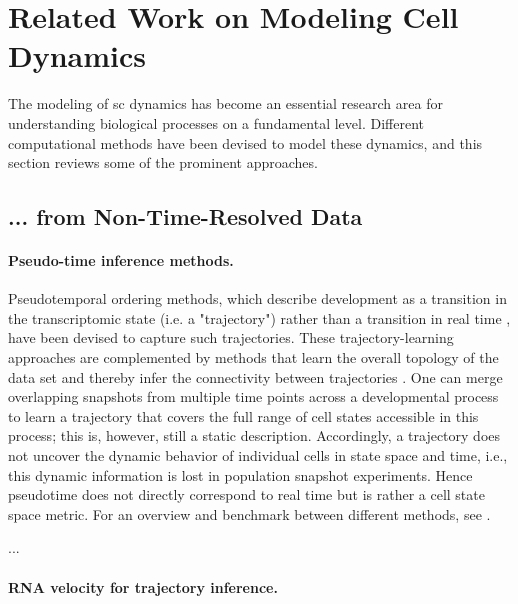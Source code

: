 \section{Related Work on Modeling Cell Dynamics}
\label{sec:related_work_bio}

The modeling of \acrlong{sc} dynamics has become an essential research area for understanding biological processes on a fundamental level. Different computational methods have been devised to model these dynamics, and this section reviews some of the prominent approaches.

\subsection*{... from Non-Time-Resolved Data}

\paragraph{Pseudo-time inference methods.}

Pseudotemporal ordering methods, which describe development as a transition in the transcriptomic state (i.e. a "trajectory") rather than a transition in real time \citep{haghverdi2016diffusion, trapnell2014dynamics}, have been devised to capture such trajectories. These trajectory-learning approaches are complemented by methods that learn the overall topology of the data set and thereby infer the connectivity between trajectories \citep{qiu2017reversed, wolf2019paga, saelens2019comparison, setty2019characterization}. One can merge overlapping snapshots from multiple time points across a developmental process to learn a trajectory that covers the full range of cell states accessible in this process; this is, however, still a static description. Accordingly, a trajectory does not uncover the dynamic behavior of individual cells in state space and time, i.e., this dynamic information is lost in population snapshot experiments. Hence pseudotime does not directly correspond to real time but is rather a cell state space metric.
For an overview and benchmark between different methods, see \citet{saelens2019comparison, tritschler2019concepts}.

\citet{qiu2022mapping} ...

\paragraph{RNA velocity for trajectory inference.}

